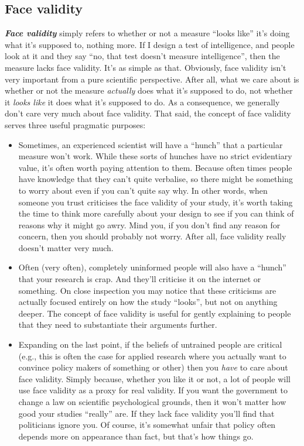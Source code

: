 \documentclass[
]{book}
\providecommand{\tightlist}{%
  \setlength{\itemsep}{0pt}\setlength{\parskip}{0pt}}
\begin{document}
\hypertarget{face-validity}{%
\subsection{Face validity}\label{face-validity}}

\textbf{\emph{Face validity}} simply refers to whether or not a measure ``looks like'' it's doing what it's supposed to, nothing more. If I design a test of intelligence, and people look at it and they say ``no, that test doesn't measure intelligence'', then the measure lacks face validity. It's as simple as that. Obviously, face validity isn't very important from a pure scientific perspective. After all, what we care about is whether or not the measure \emph{actually} does what it's supposed to do, not whether it \emph{looks like} it does what it's supposed to do. As a consequence, we generally don't care very much about face validity. That said, the concept of face validity serves three useful pragmatic purposes:

\begin{itemize}
\tightlist
\item
  Sometimes, an experienced scientist will have a ``hunch'' that a particular measure won't work. While these sorts of hunches have no strict evidentiary value, it's often worth paying attention to them. Because often times people have knowledge that they can't quite verbalise, so there might be something to worry about even if you can't quite say why. In other words, when someone you trust criticises the face validity of your study, it's worth taking the time to think more carefully about your design to see if you can think of reasons why it might go awry. Mind you, if you don't find any reason for concern, then you should probably not worry. After all, face validity really doesn't matter very much.
\item
  Often (very often), completely uninformed people will also have a ``hunch'' that your research is crap. And they'll criticise it on the internet or something. On close inspection you may notice that these criticisms are actually focused entirely on how the study ``looks'', but not on anything deeper. The concept of face validity is useful for gently explaining to people that they need to substantiate their arguments further.
\item
  Expanding on the last point, if the beliefs of untrained people are critical (e.g., this is often the case for applied research where you actually want to convince policy makers of something or other) then you \emph{have} to care about face validity. Simply because, whether you like it or not, a lot of people will use face validity as a proxy for real validity. If you want the government to change a law on scientific psychological grounds, then it won't matter how good your studies ``really'' are. If they lack face validity you'll find that politicians ignore you. Of course, it's somewhat unfair that policy often depends more on appearance than fact, but that's how things go.
\end{itemize}
\end{document}
